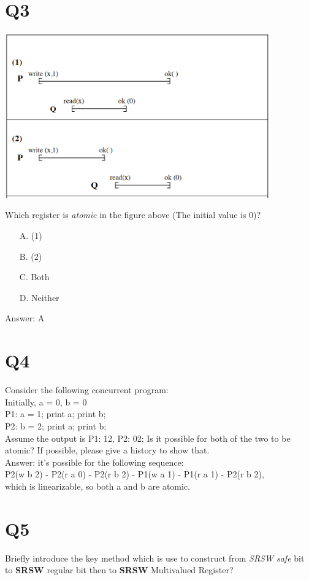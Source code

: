 \documentclass[twoside]{article}
\begin{document}
\section*{Q3}
\begin{center}
	\centering
	\includegraphics[width=4.5in]{q3.png}
\end{center}
Which register is \emph{atomic} in the figure above (The initial value is 0)?
\begin{enumerate}
	\item[A.] (1)
	\item[B.] (2)
	\item[C.] Both
	\item[D.] Neither
\end{enumerate}
	Answer: A

\section*{Q4}
Consider the following concurrent program:\\
Initially, a = 0, b = 0\\
P1: a = 1; print a; print b;\\
P2: b = 2; print a; print b;\\
Assume the output is P1: 12, P2: 02;
Is it possible for both of the two to be atomic? If possible, please give a history to show that.\\

Answer: it's possible for the following sequence:\\
P2(w b 2) - P2(r a 0) - P2(r b 2) - P1(w a 1) - P1(r a 1) - P2(r b 2),\\
which is linearizable, so both a and b are atomic.

\section*{Q5}
Briefly introduce the key method which is use to construct from \textit{SRSW safe} bit to \textbf{SRSW }regular bit then to \textbf{SRSW} Multivalued Register?\\
\end{document}
